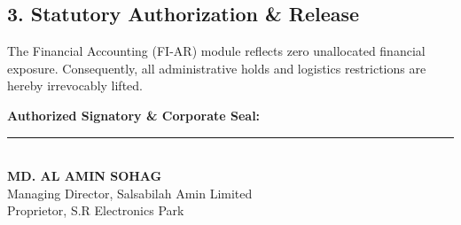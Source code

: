 \documentclass[11pt,a4paper]{article}
\begin{document}
\subsection*{3. Statutory Authorization \& Release}
The Financial Accounting (FI-AR) module reflects zero unallocated financial exposure. Consequently, all administrative holds and logistics restrictions are hereby irrevocably lifted.

\vspace{2cm}
\noindent
\textbf{Authorized Signatory \& Corporate Seal:}\\[1.5cm]
\rule{6cm}{0.4pt}\\
\textbf{MD. AL AMIN SOHAG}\\
Managing Director, Salsabilah Amin Limited\\
Proprietor, S.R Electronics Park
\end{document}
